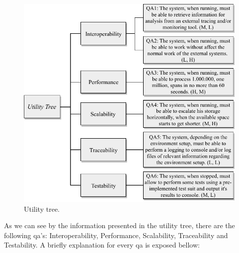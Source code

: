 \begin{figure}[!ht]
    \centering
    \includegraphics[width=1.00\textwidth]{images/utility_tree.pdf}
    \caption{Utility tree.}
    \label{fig:utility_tree}
\end{figure}

As we can see by the information presented in the utility tree, there are the following \gls{qa}'s: Interoperability, Performance, Scalability, Traceability and Testability. A briefly explanation for every \gls{qa} is exposed bellow:

